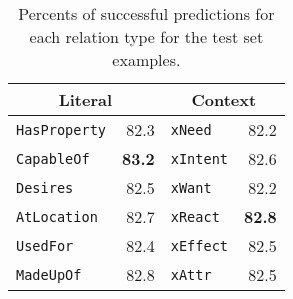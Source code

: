 \begin{table}[t]
\centering
\small
\begin{tabular}{lrlr}
\toprule
\multicolumn{2}{c}{\textbf{Literal}}  &  \multicolumn{2}{c}{\textbf{Context}} \\ \midrule
\texttt{HasProperty} & 82.3 & \texttt{xNeed} & 82.2 \\ 
\texttt{CapableOf}   & \textbf{83.2} & \texttt{xIntent} & 82.6 \\ 
\texttt{Desires}    & 82.5 & \texttt{xWant} & 82.2 \\ 
\texttt{AtLocation}  & 82.7 & \texttt{xReact} &  \textbf{82.8} \\ 
\texttt{UsedFor}     & 82.4 & \texttt{xEffect} & 82.5 \\ 
\texttt{MadeUpOf}    & 82.8 & \texttt{xAttr} & 82.5 \\ \bottomrule
\end{tabular}
\caption{Percents of successful predictions for each relation type for the test set examples.}
\label{tab:disc_analysis}
\end{table}
